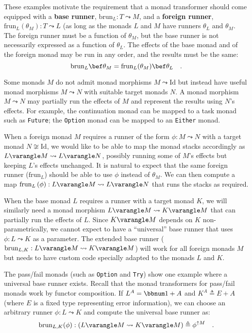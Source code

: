These examples motivate the requirement that a monad transformer should
come equipped with
a\textbf{ base runner}, $\text{brun}_{L}:T\leadsto M$, and
a \textbf{foreign runner}, $\text{frun}_{L}(\theta_{M}):T\leadsto L$
(as long as the monads $L$ and $M$ have runners $\theta_{L}$ and
$\theta_{M}$. The foreign runner must be a function of $\theta_{M}$,
but the base runner is not necessarily expressed as a function of
$\theta_{L}$. The effects of the base monad and of the foreign monad
may be run in any order, and the results must be the same:
\[
\text{brun}_{L}\bef\theta_{M}=\text{frun}_{L}(\theta_{M})\bef\theta_{L}\quad.
\]

Some monads $M$ do not admit monad morphisms $M\leadsto\text{Id}$
but instead have useful monad morphisms $M\leadsto N$ with suitable
target monads $N$. A monad morphism $M\leadsto N$ may partially
run the effects of $M$ and represent the results using $N$\textsf{'}s effects.
For example, the continuation monad can be mapped to a task monad
such as \lstinline!Future!; the \lstinline!Option! monad can be
mapped to an \lstinline!Either! monad.

When a foreign monad $M$ requires a runner of the form $\phi:M\leadsto N$
with a target monad $N\not\cong\text{Id}$, we would like to be able
to map the monad stacks accordingly as $L\varangle M\leadsto L\varangle N$,
possibly running some of $M$\textsf{'}s effects but keeping $L$\textsf{'}s effects
unchanged. It is natural to expect that the same foreign runner ($\text{frun}_{L}$)
should be able to use $\phi$ instead of $\theta_{M}$. We can then
compute a map $\text{frun}_{L}\left(\phi\right):L\varangle M\leadsto L\varangle N$
that runs the stacks as required.

When the base monad $L$ requires a runner with a target monad $K$,
we will similarly need a monad morphism $L\varangle M\leadsto K\varangle M$
that can partially run the effects of $L$. Since $K\varangle M$
depends on $K$ non-parametrically, we cannot expect to have a \textsf{``}universal\textsf{''}
base runner that uses $\phi:L\leadsto K$ as a parameter. The extended
base runner ($\text{brun}_{L,K}:L\varangle M\leadsto K\varangle M$)
will work for all foreign monads $M$ but needs to have custom code
specially adapted to the monads $L$ and $K$.

The pass/fail monads (such as \lstinline!Option! and \lstinline!Try!)
show one example where a universal base runner
exists. Recall that the monad transformers for pass/fail monads work
by functor composition. If $L^{A}=\bbnum 1+A$ and $K^{A}\triangleq E+A$
(where $E$ is a fixed type representing error information), we can
choose an arbitrary runner $\phi:L\leadsto K$ and compute the universal
base runner as:
\[
\text{brun}_{L,K}(\phi):(L\varangle M\leadsto K\varangle M)\triangleq\phi^{\uparrow M}\quad.
\]

